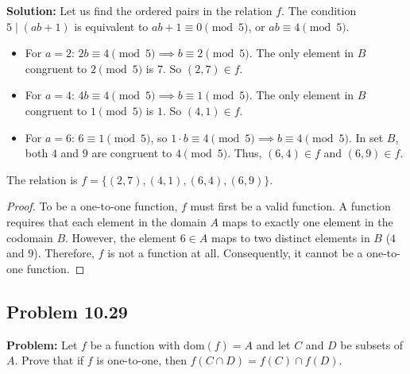 \documentclass[11pt, a4paper]{article}
\theoremstyle{definition}
\theoremstyle{remark}
\begin{document}
\textbf{Solution:}
Let us find the ordered pairs in the relation $f$. The condition $5 \mid (ab + 1)$ is equivalent to $ab + 1 \equiv 0 \pmod 5$, or $ab \equiv 4 \pmod 5$.
\begin{itemize}
    \item For $a = 2$: $2b \equiv 4 \pmod 5 \implies b \equiv 2 \pmod 5$. The only element in $B$ congruent to $2 \pmod 5$ is $7$. So $(2, 7) \in f$.
    \item For $a = 4$: $4b \equiv 4 \pmod 5 \implies b \equiv 1 \pmod 5$. The only element in $B$ congruent to $1 \pmod 5$ is $1$. So $(4, 1) \in f$.
    \item For $a = 6$: $6 \equiv 1 \pmod 5$, so $1 \cdot b \equiv 4 \pmod 5 \implies b \equiv 4 \pmod 5$. In set $B$, both $4$ and $9$ are congruent to $4 \pmod 5$. Thus, $(6, 4) \in f$ and $(6, 9) \in f$.
\end{itemize}
The relation is $f = \{(2, 7), (4, 1), (6, 4), (6, 9)\}$.
\begin{proof}
To be a one-to-one function, $f$ must first be a valid function. A function requires that each element in the domain $A$ maps to exactly one element in the codomain $B$. However, the element $6 \in A$ maps to two distinct elements in $B$ ($4$ and $9$). Therefore, $f$ is not a function at all. Consequently, it cannot be a one-to-one function.
\end{proof}

\subsection{Problem 10.29}
\textbf{Problem:} Let $f$ be a function with $\text{dom}(f) = A$ and let $C$ and $D$ be subsets of $A$. Prove that if $f$ is one-to-one, then $f(C \cap D) = f(C) \cap f(D)$.
\end{document}
